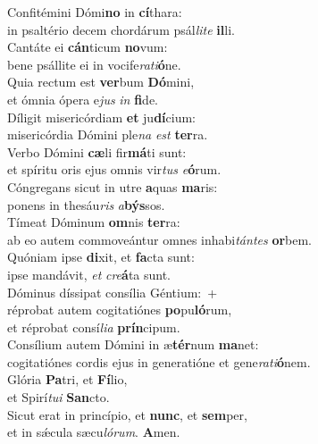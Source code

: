 \evenverse Confitémini Dómi\textbf{no} in \textbf{cí}thara:~\*\\
\evenverse in psaltério decem chordárum psál\textit{li}\textit{te} \textbf{il}li.\\
\oddverse Cantáte ei \textbf{cán}ticum \textbf{no}vum:~\*\\
\oddverse bene psállite ei in vocife\textit{ra}\textit{ti}\textbf{ó}ne.\\
\evenverse Quia rectum est \textbf{ver}bum \textbf{Dó}mini,~\*\\
\evenverse et ómnia ópera e\textit{jus} \textit{in} \textbf{fi}de.\\
\oddverse Díligit misericórdiam \textbf{et} ju\textbf{dí}cium:~\*\\
\oddverse misericórdia Dómini ple\textit{na} \textit{est} \textbf{ter}ra.\\
\evenverse Verbo Dómini \textbf{cæ}li fir\textbf{má}ti sunt:~\*\\
\evenverse et spíritu oris ejus omnis vir\textit{tus} \textit{e}\textbf{ó}rum.\\
\oddverse Cóngregans sicut in utre \textbf{a}quas \textbf{ma}ris:~\*\\
\oddverse ponens in thesáu\textit{ris} \textit{a}\textbf{býs}sos.\\
\evenverse Tímeat Dóminum \textbf{om}nis \textbf{ter}ra:~\*\\
\evenverse ab eo autem commoveántur omnes inhabi\textit{tán}\textit{tes} \textbf{or}bem.\\
\oddverse Quóniam ipse \textbf{di}xit, et \textbf{fa}cta sunt:~\*\\
\oddverse ipse mandávit, \textit{et} \textit{cre}\textbf{á}ta sunt.\\
\evenverse Dóminus díssipat consília Géntium:~+\\
\evenverse  réprobat autem cogitatiónes \textbf{po}pu\textbf{ló}rum,~\*\\
\evenverse et réprobat consí\textit{li}\textit{a} \textbf{prín}cipum.\\
\oddverse Consílium autem Dómini in æ\textbf{tér}num \textbf{ma}net:~\*\\
\oddverse cogitatiónes cordis ejus in generatióne et gene\textit{ra}\textit{ti}\textbf{ó}nem.\\
\evenverse Glória \textbf{Pa}tri, et \textbf{Fí}lio,~\*\\
\evenverse et Spirí\textit{tu}\textit{i} \textbf{San}cto.\\
\oddverse Sicut erat in princípio, et \textbf{nunc}, et \textbf{sem}per,~\*\\
\oddverse et in sǽcula sæcu\textit{ló}\textit{rum}. \textbf{A}men.\\
